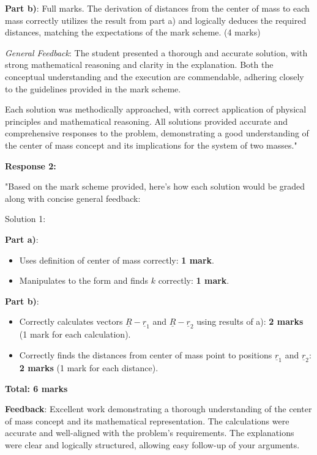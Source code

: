 \documentclass[a4paper,11pt]{article}
\begin{document}
\textbf{Part b)}: Full marks. The derivation of distances from the center of mass to each mass correctly utilizes the result from part a) and logically deduces the required distances, matching the expectations of the mark scheme. (4 marks)

\textit{General Feedback}: The student presented a thorough and accurate solution, with strong mathematical reasoning and clarity in the explanation. Both the conceptual understanding and the execution are commendable, adhering closely to the guidelines provided in the mark scheme.

Each solution was methodically approached, with correct application of physical principles and mathematical reasoning. All solutions provided accurate and comprehensive responses to the problem, demonstrating a good understanding of the center of mass concept and its implications for the system of two masses."

\textbf{Response 2:}

"Based on the mark scheme provided, here's how each solution would be graded along with concise general feedback:

Solution 1:

\textbf{Part a)}:
\begin{itemize}
    \item Uses definition of center of mass correctly: \textbf{1 mark}.
    \item Manipulates to the form and finds \( k \) correctly: \textbf{1 mark}.
\end{itemize}

\textbf{Part b)}:
\begin{itemize}
    \item Correctly calculates vectors \( \underline{R} - \underline{r}_1 \) and \( \underline{R} - \underline{r}_2 \) using results of a): \textbf{2 marks} (1 mark for each calculation).
    \item Correctly finds the distances from center of mass point to positions \( \underline{r}_1 \) and \( \underline{r}_2 \): \textbf{2 marks} (1 mark for each distance).
\end{itemize}

\textbf{Total: 6 marks}

\textbf{Feedback}: Excellent work demonstrating a thorough understanding of the center of mass concept and its mathematical representation. The calculations were accurate and well-aligned with the problem's requirements. The explanations were clear and logically structured, allowing easy follow-up of your arguments.
\end{document}
